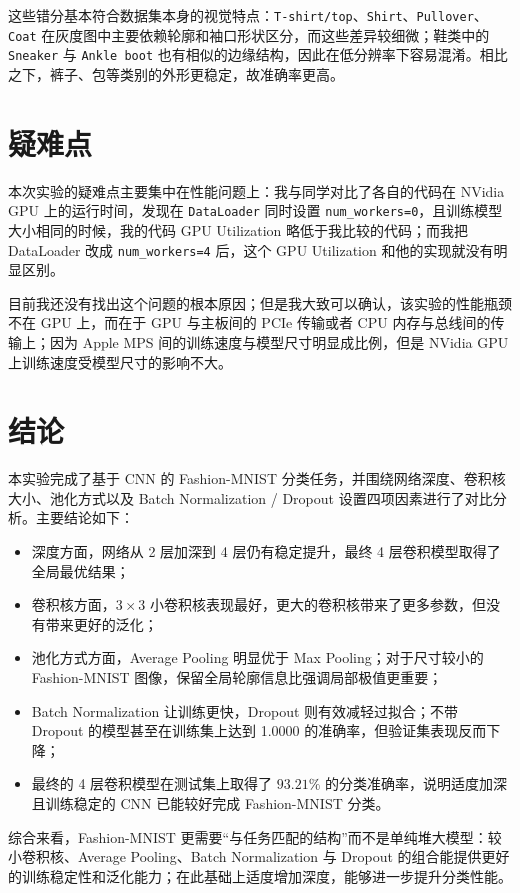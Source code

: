 \documentclass{ctexart}
\begin{document}
这些错分基本符合数据集本身的视觉特点：\texttt{T-shirt/top}、\texttt{Shirt}、\texttt{Pullover}、\texttt{Coat} 在灰度图中主要依赖轮廓和袖口形状区分，而这些差异较细微；鞋类中的 \texttt{Sneaker} 与 \texttt{Ankle boot} 也有相似的边缘结构，因此在低分辨率下容易混淆。相比之下，裤子、包等类别的外形更稳定，故准确率更高。

\section{疑难点}

本次实验的疑难点主要集中在性能问题上：我与同学对比了各自的代码在 NVidia GPU 上的运行时间，发现在 \verb|DataLoader| 同时设置 \verb|num_workers=0|，且训练模型大小相同的时候，我的代码 GPU Utilization 略低于我比较的代码；而我把 DataLoader 改成 \verb|num_workers=4| 后，这个 GPU Utilization 和他的实现就没有明显区别。

目前我还没有找出这个问题的根本原因；但是我大致可以确认，该实验的性能瓶颈不在 GPU 上，而在于 GPU 与主板间的 PCIe 传输或者 CPU 内存与总线间的传输上；因为 Apple MPS 间的训练速度与模型尺寸明显成比例，但是 NVidia GPU 上训练速度受模型尺寸的影响不大。

\section{结论}

本实验完成了基于 CNN 的 Fashion-MNIST 分类任务，并围绕网络深度、卷积核大小、池化方式以及 Batch Normalization / Dropout 设置四项因素进行了对比分析。主要结论如下：

\begin{itemize}[noitemsep]
    \item 深度方面，网络从 2 层加深到 4 层仍有稳定提升，最终 4 层卷积模型取得了全局最优结果；
    \item 卷积核方面，$3 \times 3$ 小卷积核表现最好，更大的卷积核带来了更多参数，但没有带来更好的泛化；
    \item 池化方式方面，Average Pooling 明显优于 Max Pooling；对于尺寸较小的 Fashion-MNIST 图像，保留全局轮廓信息比强调局部极值更重要；
    \item Batch Normalization 让训练更快，Dropout 则有效减轻过拟合；不带 Dropout 的模型甚至在训练集上达到 1.0000 的准确率，但验证集表现反而下降；
    \item 最终的 4 层卷积模型在测试集上取得了 $93.21\%$ 的分类准确率，说明适度加深且训练稳定的 CNN 已能较好完成 Fashion-MNIST 分类。
\end{itemize}

综合来看，Fashion-MNIST 更需要“与任务匹配的结构”而不是单纯堆大模型：较小卷积核、Average Pooling、Batch Normalization 与 Dropout 的组合能提供更好的训练稳定性和泛化能力；在此基础上适度增加深度，能够进一步提升分类性能。
\end{document}
